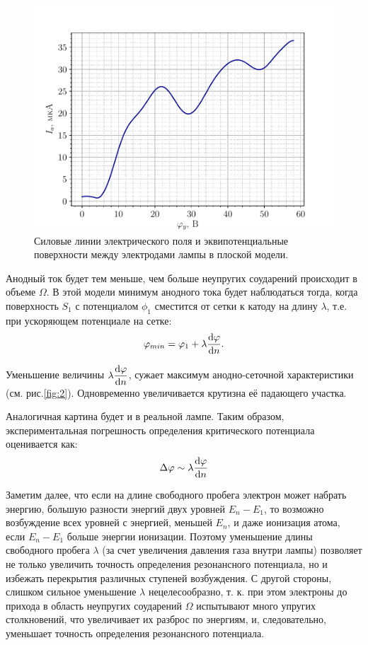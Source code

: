 \begin{figure}[H]
    \centering
    \includegraphics[]{fig/1}
    \caption{Силовые линии электрического поля и эквипотенциальные поверхности между электродами лампы в плоской модели.}
    \label{fig:3}
\end{figure}

Анодный ток будет тем меньше, чем больше неупругих соударений происходит в объеме $\Omega$. В этой модели минимум анодного тока будет наблюдаться тогда, когда поверхность $S_1$ с потенциалом $\phi_1$ сместится от сетки к катоду на длину $\lambda$, т.е. при ускоряющем потенциале на сетке:
\begin{equation*}
      \varphi_{min}= \varphi_1 +\lambda \dv{\varphi}{n}.
\end{equation*}  

Уменьшение величины $\displaystyle \lambda \dv{\varphi}{n}$, сужает максимум анодно-сеточной характеристики (см. рис.\ref{fig:2}). Одновременно увеличивается крутизна её падающего участка.

Аналогичная картина будет  и в реальной лампе. Таким образом, экспериментальная погрешность определения критического потенциала оценивается как:
\begin{equation*}
    \Delta \varphi \sim \lambda \dv{\varphi}{n}
\end{equation*}


Заметим далее, что если на длине свободного пробега электрон может набрать энергию, большую разности энергий двух уровней $E_n-E_1$, то возможно возбуждение всех уровней с
энергией, меньшей $E_n$, и даже ионизация атома, если $E_n-E_1$ больше энергии ионизации. Поэтому уменьшение длины свободного пробега $\lambda$ (за счет увеличения давления газа внутри лампы) позволяет не только увеличить точность определения резонансного потенциала, но и избежать перекрытия различных ступеней возбуждения. С другой стороны, слишком сильное уменьшение $\lambda$ нецелесообразно, т. к. при этом электроны до прихода в область неупругих соударений $\Omega$ испытывают много упругих столкновений, что увеличивает их разброс по энергиям, и, следовательно, уменьшает точность определения резонансного потенциала.

